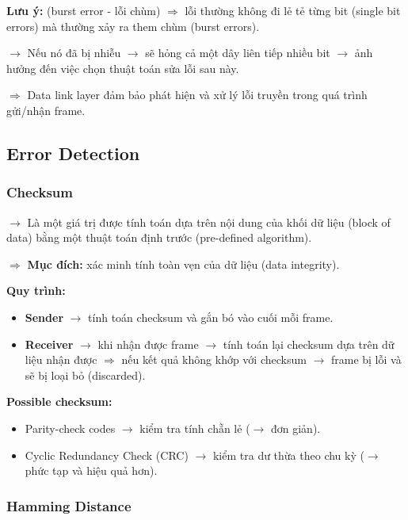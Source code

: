 \noindent
\textbf{Lưu ý:} (burst error - lỗi chùm) $\Rightarrow$ lỗi thường không đi lẻ tẻ từng bit (single bit errors) mà thường xảy ra them chùm (burst errors).

$\rightarrow$ Nếu nó đã bị nhiễu $\rightarrow$ sẽ hỏng cả một dây liên tiếp nhiều bit $\rightarrow$ ảnh hưởng đến việc chọn thuật toán sửa lỗi sau này.
\medskip

\noindent
$\Rightarrow$ Data link layer đảm bảo phát hiện và xử lý lỗi truyền trong quá trình gửi/nhận frame.
\medskip

\subsection{Error Detection}

\subsubsection{Checksum}

\noindent
$\rightarrow$ Là một giá trị được tính toán dựa trên nội dung của khối dữ liệu (block of data) bằng một thuật toán định trước (pre-defined algorithm).

$\Rightarrow$ \textbf{Mục đích:} xác minh tính toàn vẹn của dữ liệu (data integrity).
\medskip

\noindent
\textbf{Quy trình:}

\begin{itemize}
    \item \textbf{Sender} $\rightarrow$ tính toán checksum và gắn bó vào cuối mỗi frame.
    \item \textbf{Receiver} $\rightarrow$ khi nhận được frame $\rightarrow$ tính toán lại checksum dựa trên dữ liệu nhận được $\Rightarrow$ nếu kết quả không khớp với checksum $\rightarrow$ frame bị lỗi và sẽ bị loại bỏ (discarded).
\end{itemize}
\medskip

\noindent
\textbf{Possible checksum:}

\begin{itemize}
    \item Parity-check codes $\rightarrow$ kiểm tra tính chẵn lẻ ($\rightarrow$ đơn giản).
    \item Cyclic Redundancy Check (CRC) $\rightarrow$ kiểm tra dư thừa theo chu kỳ ($\rightarrow$ phức tạp và hiệu quả hơn).
\end{itemize}
\medskip

\subsubsection{Hamming Distance}

